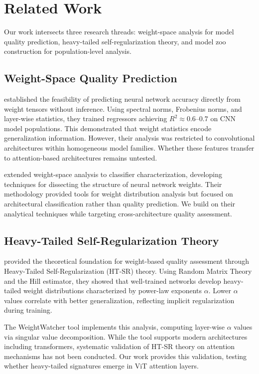 \section{Related Work}
\label{sec:related}

Our work intersects three research threads: weight-space analysis for model quality prediction, heavy-tailed self-regularization theory, and model zoo construction for population-level analysis.

\subsection{Weight-Space Quality Prediction}

\citet{unterthiner2020predicting} established the feasibility of predicting neural network accuracy directly from weight tensors without inference. Using spectral norms, Frobenius norms, and layer-wise statistics, they trained regressors achieving $R^2 \approx 0.6$--$0.7$ on CNN model populations. This demonstrated that weight statistics encode generalization information. However, their analysis was restricted to convolutional architectures within homogeneous model families. Whether these features transfer to attention-based architectures remains untested.

\citet{eilertsen2020classifying} extended weight-space analysis to classifier characterization, developing techniques for dissecting the structure of neural network weights. Their methodology provided tools for weight distribution analysis but focused on architectural classification rather than quality prediction. We build on their analytical techniques while targeting cross-architecture quality assessment.

\subsection{Heavy-Tailed Self-Regularization Theory}

\citet{martin2021implicit} provided the theoretical foundation for weight-based quality assessment through Heavy-Tailed Self-Regularization (HT-SR) theory. Using Random Matrix Theory and the Hill estimator, they showed that well-trained networks develop heavy-tailed weight distributions characterized by power-law exponents $\alpha$. Lower $\alpha$ values correlate with better generalization, reflecting implicit regularization during training.

The WeightWatcher tool \citep{weightwatcher2020} implements this analysis, computing layer-wise $\alpha$ values via singular value decomposition. While the tool supports modern architectures including transformers, systematic validation of HT-SR theory on attention mechanisms has not been conducted. Our work provides this validation, testing whether heavy-tailed signatures emerge in ViT attention layers.

